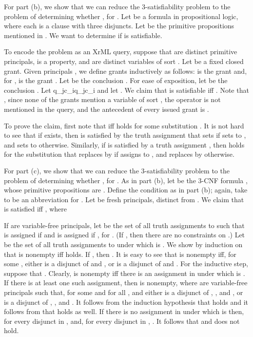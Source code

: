 \documentclass{acmtrans2m}
\newcommand{\<}{
}
\renewcommand{\>}{\rangle}
\begin{document}
For part (b), we show that we can reduce the 3-satisfiability problem to the problem of determining whether
, for .  Let  be a formula in propositional logic, where each  is a clause with three disjuncts.  Let  be the primitive propositions mentioned in .  We want to determine if  is satisfiable.

\begin{sloppypar}
To encode the problem as an XrML query, suppose that  are distinct primitive principals,  is a property, and  are distinct variables of sort .  Let  be a fixed closed grant.  Given principals , we define grants  inductively
as follows:  is the grant  and, for ,  is
the grant .  Let  be the conclusion .  For ease of exposition, let  be the conclusion .  Let
q_jc_i\neg q_jc_i
and let .  We claim that  is satisfiable iff
.  Note that
, since none of the grants mention
a variable of sort , the  operator is not mentioned in the query, and the antecedent of
every issued grant is .

To prove the claim, first note that  iff
 holds for some substitution .  It is not hard to see that if  exists, then  is satisfied by the truth assignment that sets  if  sets  to , and sets  to  otherwise.  Similarly, if  is satisfied by a truth assignment , then  holds for the substitution  that replaces  by  if  assigns  to , and replaces  by  otherwise.
\end{sloppypar}

For part (c), we show that we can reduce the 3-satisfiability problem to
the problem of determining whether ,
for .  As in part (b), let 
be the 3-CNF formula , whose primitive
propositions are .  Define the condition  as in part (b); again, take  to be an abbreviation
for .  Let  be fresh
principals, distinct from .  We claim that
 is satisfied iff , where



If  are variable-free principals, let  be the set of all truth assignments to  such that  is assigned  if  and  is assigned
 if , for .  (If , then there are no constraints on .)
Let  be the set of all truth assignments to
 under which  is .  We
show by induction on  that  is nonempty iff
 holds.  If , then .  It is easy to see that  is
nonempty iff, for some , either  is a disjunct of
 and , or  is a disjunct of  and .  For the inductive step, suppose that .  Clearly,
 is nonempty iff there is an assignment in
 under which  is .  If there is
at least one such assignment, then  is
nonempty, where  are variable-free principals such
that, for some  and for all ,  and either  is a disjunct of , , and , or  is a disjunct of , , and .  It follows from the induction hypothesis that  holds and it follows from
 that  holds as well.  If there is no assignment in
 under which  is  then, for every disjunct  in
,  and, for every disjunct  in , .  It follows that
 and  does not hold.
\end{document}
